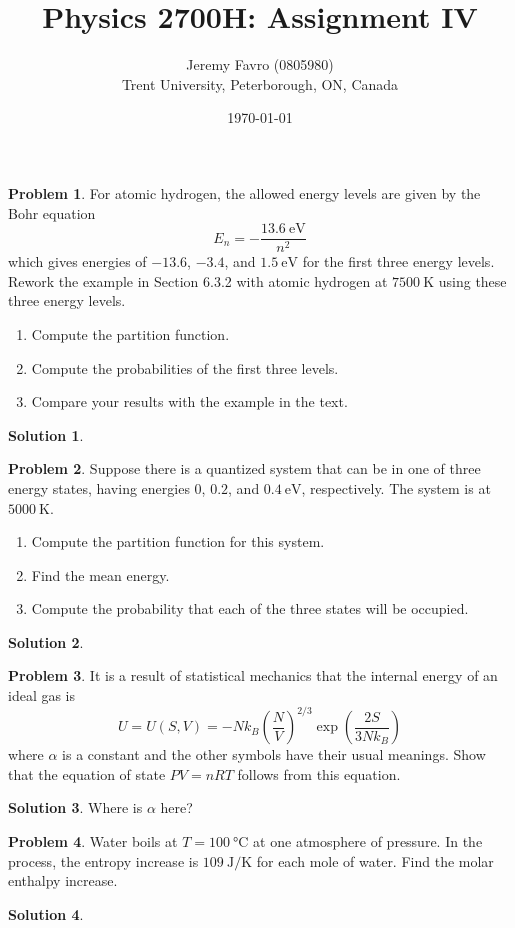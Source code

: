 \documentclass[10pt]{article}
\title{Physics 2700H: Assignment IV}
\author{Jeremy Favro (0805980) \\ Trent University, Peterborough, ON, Canada}
\date{\today}
\theoremstyle{definition}
\newtheorem{problem}{Problem}
\newtheorem{soln}{Solution}
\begin{document}
\maketitle

\begin{problem}
For atomic hydrogen, the allowed energy levels are given by the Bohr equation
$$E_n=-\frac{\qty{13.6}{\electronvolt}}{n^2}$$
which gives energies of $-13.6$, $-3.4$, and $\qty{1.5}{\electronvolt}$ for the first three energy levels.
Rework the example in Section 6.3.2 with atomic hydrogen at $\qty{7500}{\kelvin}$ using these three energy levels.
\begin{enumerate}[label=(\alph*)]
  \item Compute the partition function.
  \item Compute the probabilities of the first three levels.
  \item Compare your results with the example in the text.
\end{enumerate}
\end{problem}
\begin{soln}
\end{soln}

\begin{problem}
Suppose there is a quantized system that can be in one of three energy states, having energies $0$, $0.2$,
and $\qty{0.4}{\electronvolt}$, respectively. The system is at $\qty{5000}{\kelvin}$.
\begin{enumerate}[label=(\alph*)]
  \item Compute the partition function for this system.
  \item Find the mean energy.
  \item Compute the probability that each of the three states will be occupied.
\end{enumerate}
\end{problem}
\begin{soln}
\end{soln}

\begin{problem}
It is a result of statistical mechanics that the internal energy of an ideal gas is
$$U=U(S,V)=-Nk_B\left(\frac{N}{V}\right)^{2/3}\exp\left(\frac{2S}{3Nk_B}\right)$$
where $\alpha$ is a constant and the other symbols have their usual meanings.
Show that the equation of state $PV = nRT$ follows from this equation.
\end{problem}
\begin{soln}
  Where is $\alpha$ here?
\end{soln}

\begin{problem}
Water boils at $T = \qty{100}{\degreeCelsius}$ at one atmosphere of pressure. In the process, the entropy increase is
$\qty{109}{\joule\per\kelvin}$ for each mole of water. Find the molar enthalpy increase.
\end{problem}
\begin{soln}
\end{soln}
\end{document}
